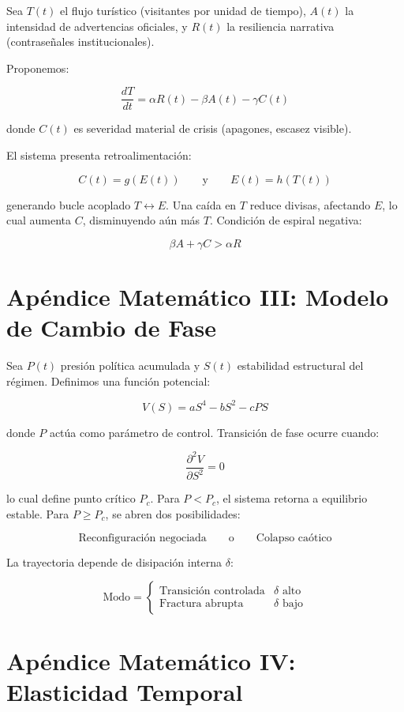 \documentclass[12pt]{article}
\begin{document}
Sea \( T(t) \) el flujo turístico (visitantes por unidad de tiempo), \( A(t) \) la intensidad de advertencias oficiales, y \( R(t) \) la resiliencia narrativa (contraseñales institucionales).

Proponemos:

\[
\frac{dT}{dt} = \alpha R(t) - \beta A(t) - \gamma C(t)
\]

donde \( C(t) \) es severidad material de crisis (apagones, escasez visible).

El sistema presenta retroalimentación:

\[
C(t) = g(E(t)) \qquad \text{y} \qquad E(t) = h(T(t))
\]

generando bucle acoplado \( T \leftrightarrow E \). Una caída en \( T \) reduce divisas, afectando \( E \), lo cual aumenta \( C \), disminuyendo aún más \( T \). Condición de espiral negativa:

\[
\beta A + \gamma C > \alpha R
\]

\section{Apéndice Matemático III: Modelo de Cambio de Fase}

Sea \( P(t) \) presión política acumulada y \( S(t) \) estabilidad estructural del régimen. Definimos una función potencial:

\[
V(S) = aS^4 - bS^2 - cP S
\]

donde \( P \) actúa como parámetro de control. Transición de fase ocurre cuando:

\[
\frac{\partial^2 V}{\partial S^2} = 0
\]

lo cual define punto crítico \( P_c \). Para \( P < P_c \), el sistema retorna a equilibrio estable. Para \( P \ge P_c \), se abren dos posibilidades:

\[
\text{Reconfiguración negociada} \qquad \text{o} \qquad \text{Colapso caótico}
\]

La trayectoria depende de disipación interna \( \delta \):

\[
\text{Modo} =
\begin{cases}
\text{Transición controlada} & \delta \text{ alto} \\
\text{Fractura abrupta} & \delta \text{ bajo}
\end{cases}
\]

\section{Apéndice Matemático IV: Elasticidad Temporal}
\end{document}
